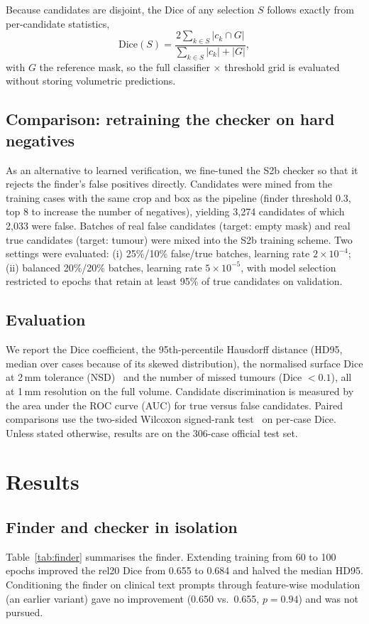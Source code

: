 \documentclass[journal]{IEEEtran}
\begin{document}
Because candidates are disjoint, the Dice of any selection $S$ follows exactly from per-candidate statistics,
\begin{equation}
\mathrm{Dice}(S)=\frac{2\sum_{k\in S}|c_k\cap G|}{\sum_{k\in S}|c_k|+|G|},
\end{equation}
with $G$ the reference mask, so the full classifier $\times$ threshold grid is evaluated without storing volumetric predictions.

\subsection{Comparison: retraining the checker on hard negatives}
As an alternative to learned verification, we fine-tuned the S2b checker so that it rejects the finder's false positives directly. Candidates were mined from the training cases with the same crop and box as the pipeline (finder threshold 0.3, top 8 to increase the number of negatives), yielding 3,274 candidates of which 2,033 were false. Batches of real false candidates (target: empty mask) and real true candidates (target: tumour) were mixed into the S2b training scheme. Two settings were evaluated: (i) 25\%/10\% false/true batches, learning rate $2\times10^{-4}$; (ii) balanced 20\%/20\% batches, learning rate $5\times10^{-5}$, with model selection restricted to epochs that retain at least 95\% of true candidates on validation.

\subsection{Evaluation}
We report the Dice coefficient, the 95th-percentile Hausdorff distance (HD95, median over cases because of its skewed distribution), the normalised surface Dice at 2\,mm tolerance (NSD)~\cite{nikolov2021nsd} and the number of missed tumours (Dice $<0.1$), all at 1\,mm resolution on the full volume. Candidate discrimination is measured by the area under the ROC curve (AUC) for true versus false candidates. Paired comparisons use the two-sided Wilcoxon signed-rank test~\cite{wilcoxon1945} on per-case Dice. Unless stated otherwise, results are on the 306-case official test set.

\section{Results}

\subsection{Finder and checker in isolation}
Table~\ref{tab:finder} summarises the finder. Extending training from 60 to 100 epochs improved the rel20 Dice from 0.655 to 0.684 and halved the median HD95. Conditioning the finder on clinical text prompts through feature-wise modulation (an earlier variant) gave no improvement (0.650 vs.\ 0.655, $p=0.94$) and was not pursued.
\end{document}
